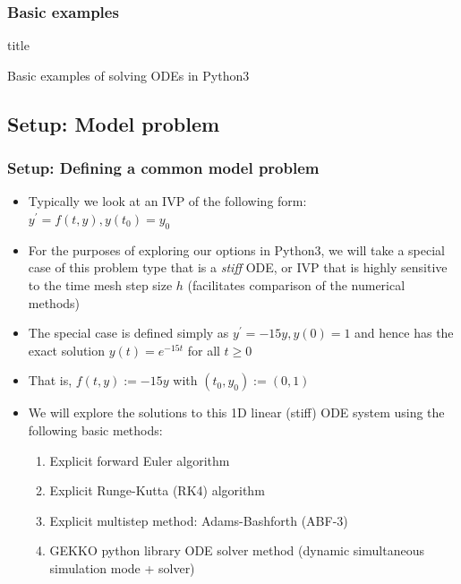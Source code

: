 \documentclass[usenames,svgnames,dvipsnames,10pt]{beamer}
\newcommand{\TitleBoxed}[1]{
     \begin{beamercolorbox}[sep=8pt,center,shadow=true,rounded=true]{title}
          \usebeamerfont{title}#1\vskip 0.6cm\par%
     \end{beamercolorbox}
}
\begin{document}
\begin{frame}
\frametitle{Basic examples} 

\TitleBoxed{
     \Large{\centerline{Basic examples of solving ODEs in Python3}}
}

\end{frame}

\subsection{Setup: Model problem}

\begin{frame}
\frametitle{Setup: Defining a common model problem}

\begin{itemize} 

\item Typically we look at an IVP of the following form: \\ 
      $y^{\prime} = f(t, y), y(t_0) = y_0$
\item For the purposes of exploring our options in Python3, we will take a 
      special case of this problem type that is a \emph{stiff} ODE, or IVP that is highly 
      sensitive to the time mesh step size $h$ (facilitates comparison of the numerical methods)
\item The special case is defined simply as $y^{\prime} = -15y, y(0) = 1$ and hence has the 
      exact solution $y(t) = e^{-15t}$ for all $t \geq 0$ 
\item That is, $f(t, y) := -15y$ with $(t_0, y_0) := (0, 1)$
\item We will explore the solutions to this 1D linear (stiff) ODE system using the 
      following basic methods: 
      \begin{enumerate}
      \item Explicit forward Euler algorithm 
      \item Explicit Runge-Kutta (RK4) algorithm 
      \item Explicit multistep method: Adams-Bashforth (ABF-$3$) 
      \item GEKKO python library ODE solver method (dynamic simultaneous simulation mode + solver)
      \end{enumerate} 

\end{itemize} 


\end{frame}
\end{document}
